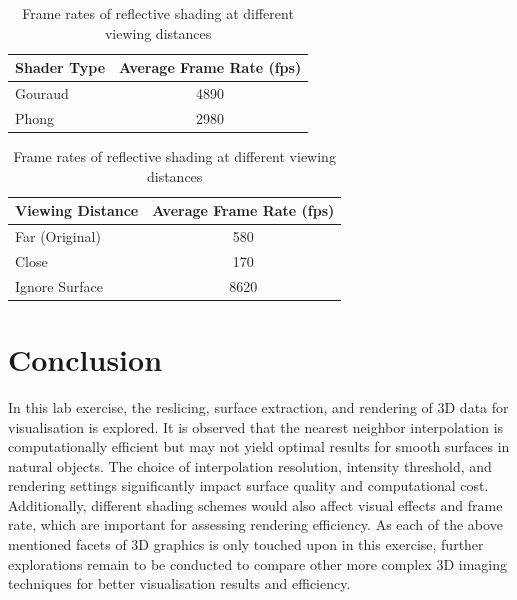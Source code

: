 \documentclass[11pt, twocolumn]{article}
\begin{document}
\begin{table}[ht]
    \centering
    \begin{tabular}{|l|c|}
        \hline
        \textbf{Shader Type} & \textbf{Average Frame Rate (fps)} \\
        \hline
        Gouraud & 4890 \\
        Phong & 2980 \\
        \hline
    \end{tabular}
    \caption{Frame rates of Gouraud and Phong shading}
    \label{tab:shaders}

    \begin{tabular}{|l|c|}
        \hline
        \textbf{Viewing Distance} & \textbf{Average Frame Rate (fps)} \\
        \hline
        Far (Original) & 580 \\
        Close & 170 \\
        Ignore Surface & 8620 \\
        \hline
    \end{tabular}
    \caption{Frame rates of reflective shading at different viewing distances}
    \label{tab:framerate}
\end{table}
\vspace{-1em}

\section{Conclusion}
In this lab exercise, the reslicing, surface extraction, and rendering of 3D data for visualisation is explored. It is observed that the nearest neighbor interpolation is computationally efficient but may not yield optimal results for smooth surfaces in natural objects. 
The choice of interpolation resolution, intensity threshold, and rendering settings significantly impact surface quality and computational cost. Additionally, different shading schemes would also affect visual effects and frame rate, which are important for assessing rendering efficiency.
As each of the above mentioned facets of 3D graphics is only touched upon in this exercise, further explorations remain to be conducted to compare other more complex 3D imaging techniques for better visualisation results and efficiency.
\end{document}
